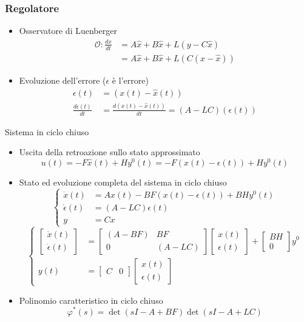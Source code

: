 \documentclass{article}
\begin{document}
\subsubsection{Regolatore}
\begin{itemize}
\item Osservatore di Luenberger
  \begin{align*}
    \mathcal{O} : \frac{d\hat{x}}{dt} &= A\hat{x} + B\hat{x} + L(y-C\hat{x}) \\
    &= A\hat{x} + B\hat{x} + L(C(x-\hat{x}))
  \end{align*}
\item Evoluzione dell'errore ($\epsilon$ è l'errore)
  \begin{align*}
    \epsilon (t) &= (x(t) - \hat{x}(t)) \\
    \frac{d\epsilon (t)}{dt} &= \frac{d(x(t)-\hat{x}(t))}{dt} = (A-LC)(\epsilon (t))
  \end{align*}
\end{itemize}
Sistema in ciclo chiuso
\begin{itemize}
\item Uscita della retroazione sullo stato approssimato
  \[ u(t) = -F\hat{x}(t) + Hy^0 (t) = -F(x(t) - \epsilon (t)) + Hy^0 (t)\]
\item Stato ed evoluzione completa del sistema in ciclo chiuso
  \[\begin{cases}
    \dot{x}(t) &= Ax(t) - BF(x(t) - \epsilon (t)) + BH y^0 (t) \\
    \dot{\epsilon}(t) &= (A-LC) \epsilon (t) \\
    y &= Cx
  \end{cases}\]
  \[\begin{cases}
  \begin{bmatrix} \dot{x}(t) \\ \dot{\epsilon}(t) \end{bmatrix} &=
  \begin{bmatrix} (A-BF) & BF \\ 0 & (A-LC) \end{bmatrix}
  \begin{bmatrix} x(t) \\ \epsilon(t) \end{bmatrix} +
  \begin{bmatrix} BH \\ 0 \end{bmatrix} y^0\\
  y(t) &= \begin{bmatrix}C & 0\end{bmatrix}
    \begin{bmatrix} x(t) \\ \epsilon(t) \end{bmatrix}
  \end{cases}\]
\item Polinomio caratteristico in ciclo chiuso
  \[ \varphi ^{\ast} (s) = \det(sI - A + BF) \det(sI - A + LC) \]
\end{itemize}
\end{document}
